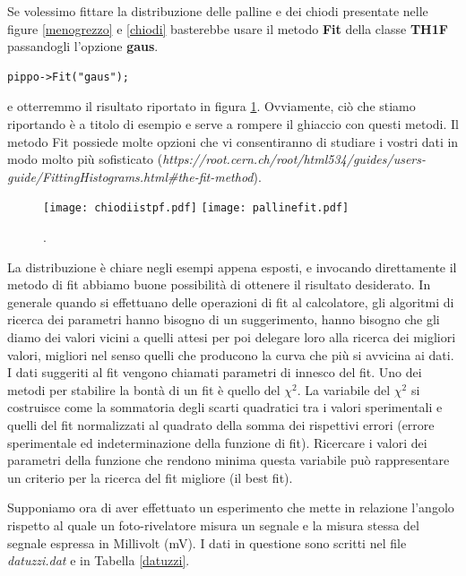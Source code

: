 \documentclass[11pt,fleqn]{book} %
\begin{document}
Se volessimo fittare la distribuzione delle palline e dei chiodi presentate nelle figure \ref{menogrezzo} e \ref{chiodi} basterebbe usare il metodo \textbf{Fit} della classe \textbf{TH1F} passandogli l'opzione \textbf{gaus}.
\begin{verbatim}
pippo->Fit("gaus");
\end{verbatim}
e otterremmo il risultato riportato in figura \ref{fittini}. Ovviamente, ciò che stiamo riportando è a titolo di esempio e serve a rompere il ghiaccio con questi metodi. Il metodo Fit possiede molte opzioni che vi consentiranno di studiare i vostri dati in modo molto più sofisticato (\textit{https://root.cern.ch/root/html534/guides/users-guide/FittingHistograms.html\#the-fit-method}).

\begin{figure}
\centering
\texttt{[image: chiodiistpf.pdf]}
\texttt{[image: pallinefit.pdf]}
\caption{  .\label{fittini}}
\end{figure}

La distribuzione è chiare negli esempi appena esposti, e invocando direttamente il metodo di fit abbiamo buone possibilità di ottenere il risultato desiderato. In generale quando si effettuano delle operazioni di fit al calcolatore, gli algoritmi di ricerca dei parametri hanno bisogno di un suggerimento, hanno bisogno che gli diamo dei valori vicini a quelli attesi per poi delegare loro alla ricerca dei migliori valori, migliori nel senso quelli che producono la curva che più si avvicina ai dati.
I dati suggeriti al fit vengono chiamati parametri di innesco del fit.
Uno dei metodi per stabilire la bontà di un fit è quello del $\chi^2$.
La variabile del $\chi^2$ si costruisce come la sommatoria degli scarti quadratici tra i valori sperimentali e quelli del fit normalizzati al quadrato della somma  dei rispettivi errori (errore sperimentale ed indeterminazione della funzione di fit). Ricercare i valori dei parametri della funzione che rendono minima questa variabile può rappresentare un criterio per la ricerca del fit migliore (il best fit).

Supponiamo ora di aver effettuato un esperimento che mette in relazione  l'angolo rispetto al quale un foto-rivelatore misura un segnale e la misura stessa del segnale espressa in Millivolt (mV). I dati in questione sono scritti nel file \textit{datuzzi.dat} e in Tabella \ref{datuzzi}.
\end{document}
